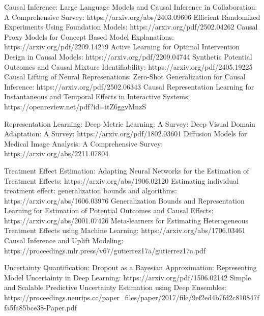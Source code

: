 Causal Inference: 
Large Language Models and Causal Inference in Collaboration: A Comprehensive Survey: https://arxiv.org/abs/2403.09606
Efficient Randomized Experiments Using Foundation Models: https://arxiv.org/pdf/2502.04262
Causal Proxy Models for Concept Based Model Explanations: https://arxiv.org/pdf/2209.14279
Active Learning for Optimal Intervention Design in Causal Models: https://arxiv.org/pdf/2209.04744
Synthetic Potential Outcomes and Causal Mixture Identifiability: https://arxiv.org/pdf/2405.19225
Causal Lifting of Neural Represenations: Zero-Shot Generalization for Causal Inference: https://arxiv.org/pdf/2502.06343
Causal Representation Learning for Instantaneous and Temporal Effects in Interactive Systems: https://openreview.net/pdf?id=itZ6ggvMnzS


Representation Learning:
Deep Metric Learning: A Survey: 
Deep Visual Domain Adaptation: A Survey: https://arxiv.org/pdf/1802.03601
Diffusion Models for Medical Image Analysis: A Comprehensive Survey: https://arxiv.org/abs/2211.07804


Treatment Effect Estimation:
Adapting Neural Networks for the Estimation of Treatment Effects: https://arxiv.org/abs/1906.02120
Estimating individual treatment effect: generalization bounds and algorithms: https://arxiv.org/abs/1606.03976
Generalization Bounds and Representation Learning for Estimation of Potential Outcomes and Causal Effects: https://arxiv.org/abs/2001.07426
Meta-learners for Estimating Heterogeneous Treatment Effects using Machine Learning: https://arxiv.org/abs/1706.03461
Causal Inference and Uplift Modeling: https://proceedings.mlr.press/v67/gutierrez17a/gutierrez17a.pdf

Uncertainty Quantification:
Dropout as a Bayesian Approximation: Representing Model Uncertainty in Deep Learning: https://arxiv.org/pdf/1506.02142
Simple and Scalable Predictive Uncertainty Estimation using Deep Ensembles: https://proceedings.neurips.cc/paper_files/paper/2017/file/9ef2ed4b7fd2c810847ffa5fa85bce38-Paper.pdf



